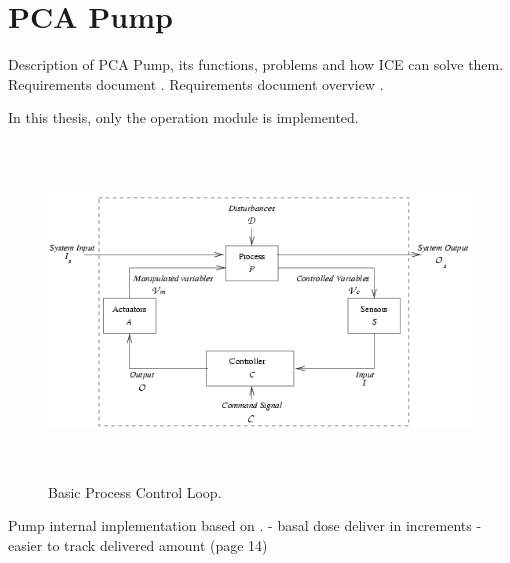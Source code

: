 
\cleardoublepage


\chapter{PCA Pump}
\label{pcapump}

Description of PCA Pump, its functions, problems and how ICE can solve them.
Requirements document \cite{PcaReq}.
Requirements document overview \cite{OpenSourcePCAPump:Paper}.

In this thesis, only the operation module is implemented.


\begin{figure}[ht]%
    \begin{center}
    	\includegraphics[height=3.5in]{figures/safety-critical-loop.png}
    	\caption{Basic Process Control Loop\protect\footnotemark.}
    \end{center}
\end{figure}

Pump internal implementation based on \cite{CADD-PrizmAmbulatoryInfusionPump:Online}.
- basal dose deliver in increments - easier to track delivered amount (page 14)



